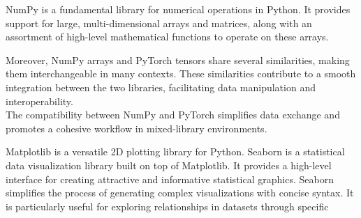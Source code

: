 NumPy is a fundamental library for numerical operations in Python. It provides support for large, multi-dimensional arrays and matrices, along with an assortment of high-level mathematical functions to operate on these arrays.

Moreover, NumPy arrays and PyTorch tensors share several similarities, making them interchangeable in many contexts. These similarities contribute to a smooth integration between the two libraries, facilitating data manipulation and interoperability.\\
The compatibility between NumPy and PyTorch simplifies data exchange and promotes a cohesive workflow in mixed-library environments.

Matplotlib is a versatile 2D plotting library for Python. Seaborn is a statistical data visualization library built on top of Matplotlib. It provides a high-level interface for creating attractive and informative statistical graphics. Seaborn simplifies the process of generating complex visualizations with concise syntax. It is particularly useful for exploring relationships in datasets through specific
